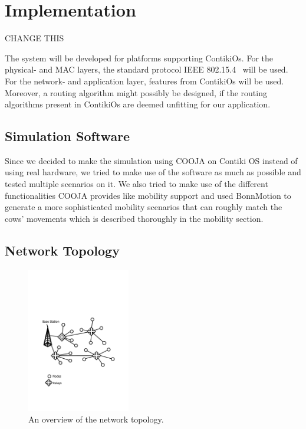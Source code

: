 \documentclass[conference]{IEEEtran}
\begin{document}
\section{Implementation}

CHANGE THIS

The system will be developed for platforms supporting ContikiOs. For the
physical- and MAC layers, the standard protocol IEEE 802.15.4~\cite{ieee802154}
will be used.  For the network- and application layer, features from ContikiOs
will be used.  Moreover, a routing algorithm might possibly be designed, if the
routing algorithms present in ContikiOs are deemed unfitting for our
application. 

\subsection{Simulation Software}

Since we decided to make the simulation using COOJA on Contiki OS instead of using 
real hardware, we tried to make use of the software as much as possible and tested 
multiple scenarios on it. We also tried to make use of the different functionalities 
COOJA provides like mobility support and used BonnMotion to generate a more sophisticated 
mobility scenarios that can roughly match the cows’ movements which is described thoroughly 
in the mobility section.

\subsection{Network Topology}

\begin{figure}
    \centering
    \includegraphics[trim= 0 150  0 150, clip, width=0.4\textwidth]{Figure1.pdf}
    \caption{An overview of the network topology.}
    \label{fig:topology}
\end{figure}
\end{document}
